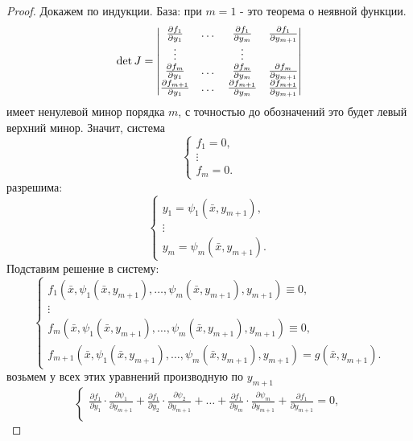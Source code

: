 \begin{proof}
    Докажем по индукции. База: при $m=1$ - это теорема о неявной функции.
    \[
        \det{J}=\begin{vmatrix}
            \frac{\partial {f_1}}{\partial {y_1}} & \dots & \frac{\partial {f_1}}{\partial {y_m}} & \frac{\partial {f_1}}{\partial {y_{m+1}}}\\
            \vdots & \null & \vdots\\
            \frac{\partial {f_m}}{\partial {y_1}} & \dots & \frac{\partial {f_m}}{\partial {y_m}} & \frac{\partial {f_m}}{\partial {y_{m+1}}}\\
            \frac{\partial {f_{m+1}}}{\partial {y_1}} & \dots & \frac{\partial {f_{m+1}}}{\partial {y_m}} & \frac{\partial {f_{m+1}}}{\partial {y_{m+1}}}
        \end{vmatrix}
    \]
    имеет ненулевой минор порядка $m$, с точностью до обозначений это будет левый верхний минор. Значит, система
    \[\begin{cases}
        f_1 = 0,\\
        \vdots\\
        f_m=0.
    \end{cases}
    \]
    разрешима:
    \[\begin{cases}
        y_1=\psi_1(\bar{x},y_{m+1}),\\
        \vdots\\
        y_m=\psi_m(\bar{x}, y_{m+1}).
    \end{cases}
    \]
    Подставим решение в систему:
    \[\begin{cases}
        f_1(\bar{x}, \psi_1(\bar{x}, y_{m+1}), \dots, \psi_m(\bar{x}, y_{m+1}), y_{m+1})\equiv 0,\\
        \vdots\\
        f_m(\bar{x}, \psi_1(\bar{x}, y_{m+1}), \dots, \psi_m(\bar{x}, y_{m+1}), y_{m+1})\equiv 0,\\
        f_{m+1}(\bar{x}, \psi_1(\bar{x}, y_{m+1}),\dots,\psi_m(\bar{x}, y_{m+1}), y_{m+1})=g(\bar{x}, y_{m+1}).
    \end{cases}
    \]
    возьмем у всех этих уравнений производную по $y_{m+1}$
    \[\begin{cases}
        \frac{\partial {f_1}}{\partial {y_1}}\cdot \frac{\partial {\psi_1}}{\partial {y_{m+1}}}+\frac{\partial {f_1}}{\partial {y_2}}\cdot \frac{\partial {\psi_2}}{\partial {y_{m+1}}}+ \dots +\frac{\partial {f_1}}{\partial {y_m}}\cdot \frac{\partial {\psi_m}}{\partial {y_{m+1}}}+\frac{\partial {f_1}}{\partial {y_{m+1}}}=0,\\

\end{cases}\]
\end{proof}
